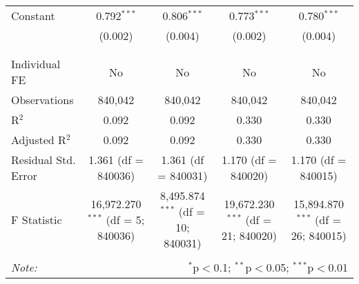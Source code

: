 \documentclass[
]{article}
\begin{document}
\begin{table}[!htbp]
{\begin{tabular}{@{\extracolsep{5pt}}lcccc}
 Constant & 0.792$^{***}$ & 0.806$^{***}$ & 0.773$^{***}$ & 0.780$^{***}$ \\ 
  & (0.002) & (0.004) & (0.002) & (0.004) \\ 
  & & & & \\ 
\hline \\[-1.8ex] 
Individual FE & No & No & No & No \\ 
Observations & 840,042 & 840,042 & 840,042 & 840,042 \\ 
R$^{2}$ & 0.092 & 0.092 & 0.330 & 0.330 \\ 
Adjusted R$^{2}$ & 0.092 & 0.092 & 0.330 & 0.330 \\ 
Residual Std. Error & 1.361 (df = 840036) & 1.361 (df = 840031) & 1.170 (df = 840020) & 1.170 (df = 840015) \\ 
F Statistic & 16,972.270$^{***}$ (df = 5; 840036) & 8,495.874$^{***}$ (df = 10; 840031) & 19,672.230$^{***}$ (df = 21; 840020) & 15,894.870$^{***}$ (df = 26; 840015) \\ 
\hline 
\hline \\[-1.8ex] 
\textit{Note:}  & \multicolumn{4}{r}{$^{*}$p$<$0.1; $^{**}$p$<$0.05; $^{***}$p$<$0.01} \\ 
\end{tabular}
} 
\end{table} 
\newpage
\end{document}
